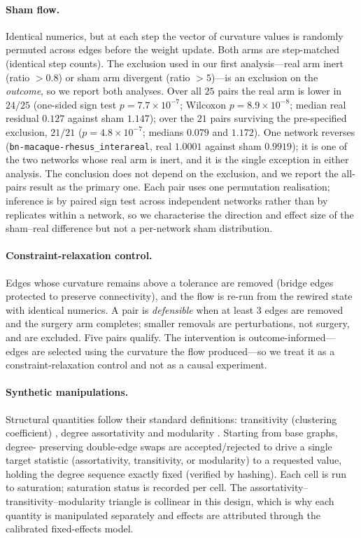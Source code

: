 \documentclass[11pt]{article}
\begin{document}
\paragraph{Sham flow.} Identical numerics, but at each step the vector of
curvature values is randomly permuted across edges before the weight update.
Both arms are step-matched (identical step counts). The exclusion used in our
first analysis---real arm inert (ratio $>0.8$) or sham arm divergent
(ratio $>5$)---is an exclusion on the \emph{outcome}, so we report both
analyses. Over all $25$ pairs the real arm is lower in $24/25$ (one-sided sign
test $p = 7.7\times10^{-7}$; Wilcoxon $p = 8.9\times10^{-8}$; median real
residual $0.127$ against sham $1.147$); over the $21$ pairs surviving the
pre-specified exclusion, $21/21$ ($p = 4.8\times10^{-7}$; medians $0.079$ and
$1.172$). One network reverses (\texttt{bn-macaque-rhesus\_interareal}, real
$1.0001$ against sham $0.9919$); it is one of the two networks whose real arm
is inert, and it is the single exception in either analysis. The conclusion
does not depend on the exclusion, and we report the all-pairs result as the
primary one. Each pair uses one permutation realisation; inference is by paired
sign test across independent networks rather than by replicates within a
network, so we characterise the direction and effect size of the sham--real
difference but not a per-network sham distribution.

\paragraph{Constraint-relaxation control.} Edges whose curvature remains above
a tolerance are removed (bridge edges protected to preserve connectivity), and
the flow is re-run from the rewired state with identical numerics. A pair is
\emph{defensible} when at least 3 edges are removed and the surgery arm
completes; smaller removals are perturbations, not surgery, and are
excluded. Five pairs qualify. The intervention is outcome-informed---edges are
selected using the curvature the flow produced---so we treat it as a
constraint-relaxation control and not as a causal experiment.

\paragraph{Synthetic manipulations.} Structural quantities follow their
standard definitions: transitivity (clustering coefficient)
\cite{WattsStrogatz1998}, degree assortativity \cite{Newman2002} and
modularity \cite{GirvanNewman2002}. Starting from base graphs, degree-
preserving double-edge swaps are accepted/rejected to drive a single target
statistic (assortativity, transitivity, or modularity) to a requested value,
holding the degree sequence exactly fixed (verified by hashing). Each cell
is run to saturation; saturation status is recorded per cell. The
assortativity--transitivity--modularity triangle is collinear in this design,
which is why each quantity is manipulated separately and effects are
attributed through the calibrated fixed-effects model.
\end{document}
